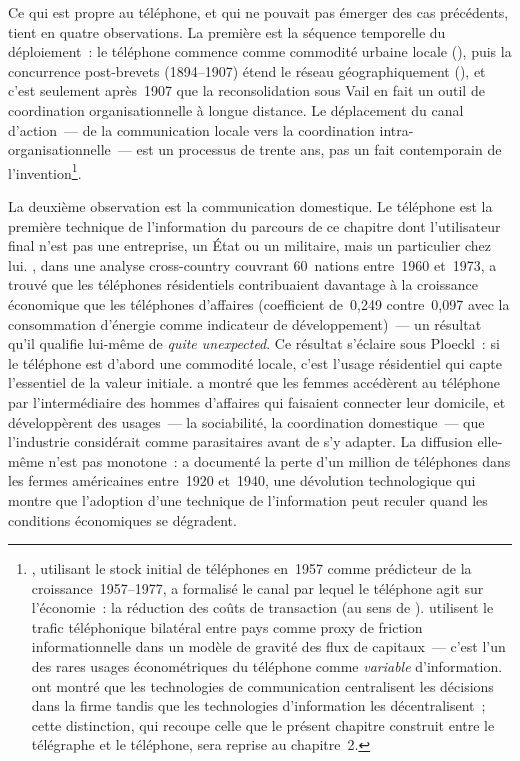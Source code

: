 Ce qui est propre au téléphone, et qui ne pouvait pas émerger des cas précédents, tient en quatre observations. La première est la séquence temporelle du déploiement~: le téléphone commence comme commodité urbaine locale (\textcite{ploeckl_market_2023}), puis la concurrence post-brevets (1894--1907) étend le réseau géographiquement (\textcite{gabel_early_1969}), et c'est seulement après~1907 que la reconsolidation sous Vail en fait un outil de coordination organisationnelle à longue distance. Le déplacement du canal d'action~--- de la communication locale vers la coordination intra-organisationnelle~--- est un processus de trente ans, pas un fait contemporain de l'invention\footnote{\textcite{norton_transaction_1992}, utilisant le stock initial de téléphones en~1957 comme prédicteur de la croissance~1957--1977, a formalisé le canal par lequel le téléphone agit sur l'économie~: la réduction des coûts de transaction (au sens de \textcite{leff_externalities_1984}). \textcite{portes_determinants_2005} utilisent le trafic téléphonique bilatéral entre pays comme proxy de friction informationnelle dans un modèle de gravité des flux de capitaux~--- c'est l'un des rares usages économétriques du téléphone comme \emph{variable} d'information. \textcite{bloom_distinct_2014} ont montré que les technologies de communication centralisent les décisions dans la firme tandis que les technologies d'information les décentralisent~; cette distinction, qui recoupe celle que le présent chapitre construit entre le télégraphe et le téléphone, sera reprise au chapitre~2.}.

La deuxième observation est la communication domestique. Le téléphone est la première technique de l'information du parcours de ce chapitre dont l'utilisateur final n'est pas une entreprise, un État ou un militaire, mais un particulier chez lui. \textcite{hardy_role_1980}, dans une analyse cross-country couvrant 60~nations entre~1960 et~1973, a trouvé que les téléphones résidentiels contribuaient davantage à la croissance économique que les téléphones d'affaires (coefficient de~0,249 contre~0,097 avec la consommation d'énergie comme indicateur de développement)~--- un résultat qu'il qualifie lui-même de \og \emph{quite unexpected}\fg{}. Ce résultat s'éclaire sous Ploeckl~: si le téléphone est d'abord une commodité locale, c'est l'usage résidentiel qui capte l'essentiel de la valeur initiale. \textcite{martin_culture_1998} a montré que les femmes accédèrent au téléphone par l'intermédiaire des hommes d'affaires qui faisaient connecter leur domicile, et développèrent des usages~--- la sociabilité, la coordination domestique~--- que l'industrie considérait comme parasitaires avant de s'y adapter. La diffusion elle-même n'est pas monotone~: \textcite{fischer_technologys_1987} a documenté la perte d'un million de téléphones dans les fermes américaines entre~1920 et~1940, une dévolution technologique qui montre que l'adoption d'une technique de l'information peut reculer quand les conditions économiques se dégradent.

